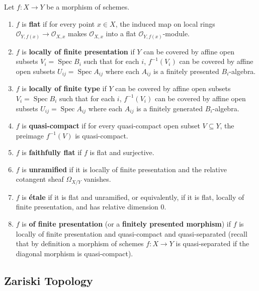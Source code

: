 \documentclass[12pt]{article}
\begin{document}
\begin{definition}
    Let $f: X \to Y$ be a morphism of schemes.
    \begin{enumerate}
        \item $f$ is \textbf{flat} if for every point $x \in X$, the induced map on local rings $\mathcal{O}_{Y,f(x)} \to \mathcal{O}_{X,x}$ makes $\mathcal{O}_{X,x}$ into a flat $\mathcal{O}_{Y,f(x)}$-module.

        \item $f$ is \textbf{locally of finite presentation} if $Y$ can be covered by affine open subsets $V_i = \operatorname{Spec} B_i$ such that for each $i$, $f^{-1}(V_i)$ can be covered by affine open subsets $U_{ij} = \operatorname{Spec} A_{ij}$ where each $A_{ij}$ is a finitely presented $B_i$-algebra.
        \item $f$ is \textbf{locally of finite type} if $Y$ can be covered by affine open subsets $V_i = \operatorname{Spec} B_i$ such that for each $i$, $f^{-1}(V_i)$ can be covered by affine open subsets $U_{ij} = \operatorname{Spec} A_{ij}$ where each $A_{ij}$ is a finitely generated $B_i$-algebra.

        \item $f$ is \textbf{quasi-compact} if for every quasi-compact open subset $V \subseteq Y$, the preimage $f^{-1}(V)$ is quasi-compact.

        \item $f$ is \textbf{faithfully flat} if $f$ is flat and surjective.

        \item $f$ is \textbf{unramified} if it is locally of finite presentation and the relative cotangent sheaf $\Omega_{X/Y}$ vanishes.

        \item $f$ is \textbf{étale} if it is flat and unramified, or equivalently, if it is flat, locally of finite presentation, and has relative dimension 0.
        \item $f$ is \textbf{of finite presentation} (or a \textbf{finitely presented morphism}) if $f$ is locally of finite presentation and quasi-compact and quasi-separated (recall that by definition a morphism of schemes $f : X \to Y$ is quasi-separated if the diagonal morphism is quasi-compact).
    \end{enumerate}
\end{definition}


\subsection{Zariski Topology}
\end{document}
